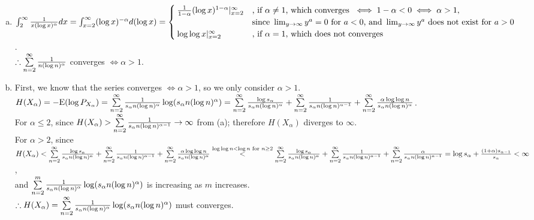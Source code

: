 \begin{pr}$ $
\begin{enumerate}[(a)]
\item $\int_2^\infty\frac1{x(\log x)^\alpha}dx=\int_{x=2}^\infty(\log x)^{-\alpha}d(\log x)\\
=\begin{cases}
\frac1{1-\alpha}(\log x)^{1-\alpha}|_{x=2}^\infty&\text{, if }\alpha\neq1\text{, which converges }\iff1-\alpha<0\iff\alpha>1,\\
&\text{since }\lim_{y\to\infty}y^a=0\text{ for }a<0\text{, and }\lim_{y\to\infty}y^a\text{ does not exist for }a>0\\
\log\log x|_{x=2}^\infty&\text{, if }\alpha=1\text{, which does not converges}
\end{cases}$.\\
$\therefore\sum\limits_{n=2}^\infty\frac1{n(\log n)^\alpha}$ converges $\iff\alpha>1$.
\item First, we know that the series converges $\iff\alpha>1$, so we only consider $\alpha>1$.\\
$H(X_\alpha)=-\mathrm{E}(\log P_{X_\alpha})=\sum\limits_{n=2}^\infty\frac1{s_\alpha n(\log n)^\alpha}\log(s_\alpha n(\log n)^\alpha)=\sum\limits_{n=2}^\infty\frac{\log s_\alpha}{s_\alpha n(\log n)^\alpha}+\sum\limits_{n=2}^\infty\frac1{s_\alpha n(\log n)^{\alpha-1}}+\sum\limits_{n=2}^\infty\frac{\alpha\log\log n}{s_\alpha n(\log n)^\alpha}$.\\
For $\alpha\leq2$, since $H(X_\alpha)>\sum\limits_{n=2}^\infty\frac1{s_\alpha n(\log n)^{\alpha-1}}\to\infty$ from (a); therefore $H(X_\alpha)$ diverges to $\infty$.\\
For $\alpha>2$, since $H(X_\alpha)<\sum\limits_{n=2}^\infty\frac{\log s_\alpha}{s_\alpha n(\log n)^\alpha}+\sum\limits_{n=2}^\infty\frac1{s_\alpha n(\log n)^{\alpha-1}}+\sum\limits_{n=2}^\infty\frac{\alpha\log\log n}{s_\alpha n(\log n)^\alpha}\\
\overset{\log\log n<\log n\text{ for }n\geq2}<\sum\limits_{n=2}^\infty\frac{\log s_\alpha}{s_\alpha n(\log n)^\alpha}+\sum\limits_{n=2}^\infty\frac1{s_\alpha n(\log n)^{\alpha-1}}+\sum\limits_{n=2}^\infty\frac{\alpha}{s_\alpha n(\log n)^{\alpha-1}}\\
=\log s_\alpha+\frac{(1+\alpha)s_{\alpha-1}}{s_\alpha}<\infty$,\\
and $\sum\limits_{n=2}^m\frac1{s_\alpha n(\log n)^\alpha}\log(s_\alpha n(\log n)^\alpha)$ is increasing as $m$ increases.\\
$\therefore H(X_\alpha)=\sum\limits_{n=2}^\infty\frac1{s_\alpha n(\log n)^\alpha}\log(s_\alpha n(\log n)^\alpha)$ must converges.
\end{enumerate}
\end{pr}
